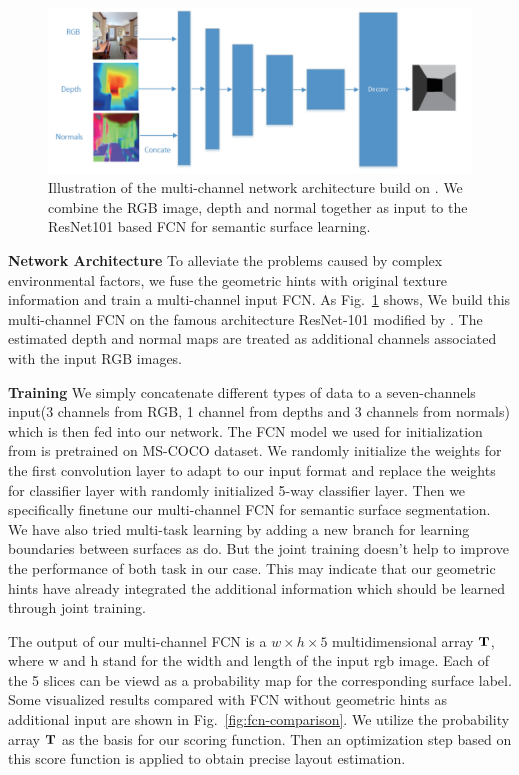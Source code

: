 \begin{figure}
	\centering
	\includegraphics[width=\columnwidth]{figure/fcn-multi-channel.png}
	\caption{Illustration of the multi-channel network architecture build on \cite{chen2016deeplab}. We combine the RGB image, depth and normal together as input to the ResNet101 based FCN for semantic surface learning. }
	\label{fig:fcn-multi-channel}
\end{figure}


\textbf{Network Architecture}
To alleviate the problems caused by complex environmental factors, we fuse the geometric hints with original texture information and train a multi-channel input FCN. As Fig.~\ref{fig:fcn-multi-channel} shows, We build this multi-channel FCN on the famous architecture ResNet-101 \cite{he2016deep} modified by \cite{chen2016deeplab}. The estimated depth and normal maps are treated as additional channels associated with the input RGB images. 

\textbf{Training}
We simply concatenate different types of data to a seven-channels input(3 channels from RGB, 1 channel from depths and 3 channels from normals) which is then fed into our network. The FCN model we used for initialization from \cite{chen2016deeplab} is pretrained on MS-COCO dataset. We randomly initialize the weights for the first convolution layer to adapt to our input format and replace the weights for classifier layer with randomly initialized 5-way classifier layer. Then we specifically finetune our multi-channel FCN for semantic surface segmentation. We have also tried multi-task learning by adding a new branch for learning boundaries between surfaces as \cite{ren2016coarse, mallya2015learning} do. But the joint training doesn't help to improve the performance of both task in our case. This may indicate that our geometric hints have already integrated the additional information which should be learned through joint training.

The output of our multi-channel FCN is a $w\times h \times 5$ multidimensional array $\mathbf{T}$, where w and h stand for the width and length of the input rgb image. Each of the 5 slices can be viewd as a probability map for the corresponding surface label. Some visualized results compared with FCN without geometric hints as additional input are shown in Fig.~\ref{fig:fcn-comparison}. We utilize the probability array $\mathbf{T}$ as the basis for our scoring function. Then an optimization step based on this score function is applied to obtain precise layout estimation.


